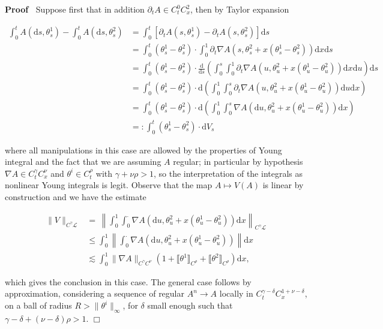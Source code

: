 \documentclass[10pt]{article}
\newcommand{\backassign}{=:}
\newcommand{\mathd}{\mathrm{d}}
\newenvironment{proof}{\noindent\textbf{Proof\ }}{\hspace*{\fill}$\Box$\medskip}
\begin{document}
\begin{proof}
  Suppose first that in addition $\partial_t A \in C^0_t C^2_x$, then by
  Taylor expansion
  
  \begin{align*}
    \int_0^t A (\mathd s, \theta^1_s) - \int_0^t A (\mathd s, \theta^2_s) & =
    \int_0^t [\partial_t A (s, \theta^1_s) - \partial_t A (s, \theta^2_s)]
    \mathd s\\
    & = \int_0^t (\theta^1_s - \theta^2_s) \cdot \int_0^1 \partial_t \nabla A
    (s, \theta^2_s + x (\theta^1_s - \theta^2_s)) \mathd x \mathd s\\
    & = \int_0^t (\theta^1_s - \theta^2_s) \cdot \frac{\mathd}{\mathd s}
    \left( \int_0^s \int_0^1 \partial_t \nabla A (u, \theta^2_u + x
    (\theta^1_u - \theta^2_u)) \mathd x \mathd u \right) \mathd s\\
    & = \int_0^t (\theta^1_s - \theta^2_s) \cdot \mathd \left( \int_0^1
    \int_0^s \partial_t \nabla A (u, \theta^2_u + x (\theta^1_u - \theta^2_u))
    \mathd u \mathd x \right)\\
    & = \int_0^t (\theta^1_s - \theta^2_s) \cdot \mathd \left( \int_0^1
    \int_0^s \nabla A (\mathd u, \theta^2_u + x (\theta^1_u - \theta^2_u))
    \mathd x \right)\\
    & \backassign \int_0^t (\theta^1_s - \theta^2_s) \cdot \mathd V_s
  \end{align*}
  
  where all manipulations in this case are allowed by the properties of Young
  integral and the fact that we are assuming $A$ regular; in particular by
  hypothesis $\nabla A \in C^{\gamma}_t C^{\nu}_x$ and $\theta^i \in
  C^{\rho}_t$ with $\gamma + \nu \rho > 1$, so the interpretation of the
  integrals as nonlinear Young integrals is legit. Observe that the map $A
  \mapsto V (A)$ is linear by construction and we have the estimate
  
  \begin{align*}
    \| V \|_{C^{\gamma} \mathcal{L}} & = \, \left\| \int_0^1 \int_0^{\cdot}
    \nabla A (\mathd u, \theta^2_u + x (\theta^1_u - \theta^2_u)) \mathd x
    \right\|_{C^{\gamma} \mathcal{L}}\\
    & \leqslant \int_0^1 \left\| \int_0^{\cdot} \nabla A (\mathd u,
    \theta^2_u + x (\theta^1_u - \theta^2_u)) \right\| \mathd x\\
    & \lesssim \int_0^1 \| \nabla A \|_{C^{\gamma} C^{\nu}} (1 + \llbracket
    \theta^1 \rrbracket_{C^{\rho}} + \llbracket \theta^2
    \rrbracket_{C^{\rho}}) \mathd x,
  \end{align*}
  
  which gives the conclusion in this case. The general case follows by
  approximation, considering a sequence of regular $A^n \rightarrow A$ locally
  in $C^{\gamma - \delta}_t C^{1 + \nu - \delta}_x$, on a ball of radius $R >
  \| \theta^i \|_{\infty}$, for $\delta$ small enough such that $\gamma -
  \delta + (\nu - \delta) \rho > 1$.
\end{proof}
\end{document}
